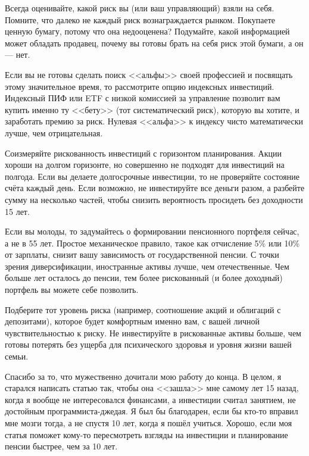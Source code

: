 Всегда оценивайте, какой риск вы (или ваш управляющий) взяли на себя. Помните, 
что далеко не каждый риск вознаграждается рынком. Покупаете ценную бумагу, 
потому что она недооценена? Подумайте, какой информацией может обладать 
продавец, почему вы готовы брать на себя риск этой бумаги, а он --- нет.

Если вы не готовы сделать поиск <<альфы>> своей профессией и посвящать этому
значительное время, то рассмотрите опцию индексных инвестиций. Индексный ПИФ 
или ETF с низкой комиссией за управление позволит вам купить именно ту <<бету>> 
(тот систематический риск), которую вы хотите, и заработать премию за риск. 
Нулевая <<альфа>> к индексу чисто математически лучше, чем отрицательная.

Соизмеряйте рискованность инвестиций с горизонтом планирования. Акции хороши на 
долгом горизонте, но совершенно не подходят для инвестиций на полгода. Если вы 
делаете долгосрочные инвестиции, то не проверяйте состояние счёта каждый день. 
Если возможно, не инвестируйте все деньги разом, а разбейте сумму на несколько 
частей, чтобы снизить вероятность просидеть без доходности 15 лет.

Если вы молоды, то задумайтесь о формировании пенсионного портфеля сейчас, а не 
в 55 лет. Простое механическое правило, такое как отчисление 5\% или 10\% от 
зарплаты, снизит вашу зависимость от государственной пенсии. С точки зрения 
диверсификации, иностранные активы лучше, чем отечественные. Чем больше лет 
осталось до пенсии, тем более рискованный (и более доходный) портфель вы можете 
себе позволить.

Подберите тот уровень риска (например, соотношение акций и облигаций с 
депозитами), которое будет комфортным именно вам, с вашей личной 
чувствительностью к риску. Не инвестируйте в рискованные активы больше, чем 
готовы потерять без ущерба для психического здоровья и уровня жизни вашей 
семьи.

Спасибо за то, что мужественно дочитали мою работу до конца. В целом, я 
старался написать статью так, чтобы она <<зашла>> мне самому лет 15 назад, 
когда я вообще не интересовался финансами, а инвестиции считал занятием, не 
достойным программиста-джедая. Я был бы благодарен, если бы кто-то вправил мне 
мозги тогда, а не спустя 10 лет, когда я пошёл учиться. Хорошо, если моя статья
поможет кому-то пересмотреть взгляды на инвестиции и планирование пенсии 
быстрее, чем за 10 лет.

\clearpage
{}

